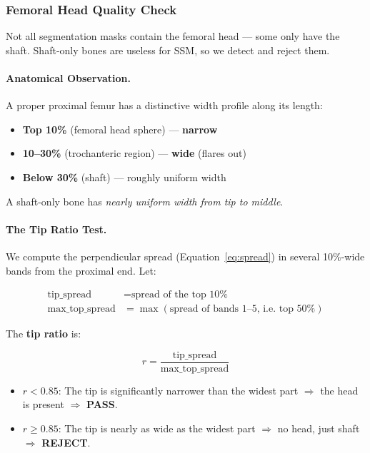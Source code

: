 \documentclass[12pt,a4paper]{article}
\begin{document}
\subsubsection{Femoral Head Quality Check}
\label{sec:headcheck}

Not all segmentation masks contain the femoral head — some only have the shaft.
Shaft-only bones are useless for SSM, so we detect and reject them.

\paragraph{Anatomical Observation.}
A proper proximal femur has a distinctive width profile along its length:
\begin{itemize}
    \item \textbf{Top 10\%} (femoral head sphere) — \textbf{narrow}
    \item \textbf{10--30\%} (trochanteric region) — \textbf{wide} (flares out)
    \item \textbf{Below 30\%} (shaft) — roughly uniform width
\end{itemize}

A shaft-only bone has \emph{nearly uniform width from tip to middle}.

\paragraph{The Tip Ratio Test.}
We compute the perpendicular spread (Equation~\ref{eq:spread}) in several
10\%-wide bands from the proximal end.  Let:

\begin{align}
    \text{tip\_spread}     &= \text{spread of the top 10\%} \\
    \text{max\_top\_spread} &= \max(\text{spread of bands 1--5, i.e.\ top 50\%})
\end{align}

The \textbf{tip ratio} is:

\begin{equation}
    \boxed{
        r = \frac{\text{tip\_spread}}{\text{max\_top\_spread}}
    }
    \label{eq:tipratio}
\end{equation}

\begin{itemize}
    \item $r < 0.85$: The tip is significantly narrower than the widest part
          $\Rightarrow$ the head is present $\Rightarrow$ \textbf{PASS}.
    \item $r \geq 0.85$: The tip is nearly as wide as the widest part
          $\Rightarrow$ no head, just shaft $\Rightarrow$ \textbf{REJECT}.
\end{itemize}
\end{document}
